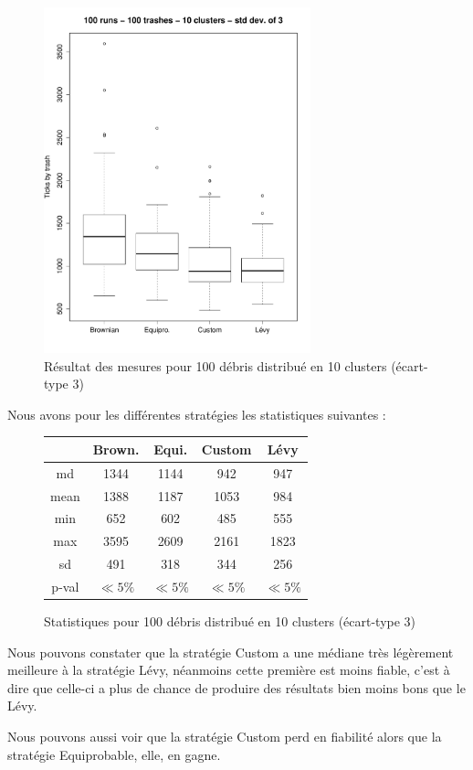 

\begin{figure}[H]
	\begin{center}
		\includegraphics[height=10cm]{diagrams/100Tr10Clts_all.pdf}
		\caption{Résultat des mesures pour 100 débris distribué en 10 clusters (écart-type 3)}
		\label{fig:100Trashes_10Clusters}
	\end{center}
\end{figure}

Nous avons pour les différentes stratégies les statistiques suivantes :

\begin{figure}[H]
	\begin{center}
		\begin{tabular}{| c || c | c | c | c | }
			\hline
			&Brown.&Equi.&Custom&Lévy \\
			\hline
			\hline
			md&1344&1144&942&947\\
			mean&1388&1187&1053&984\\
			min & 652 & 602 & 485 & 555 \\
			max & 3595 & 2609 & 2161 & 1823 \\
			sd&491&318&344&256\\
			p-val&$\ll 5\%$&$\ll 5\%$&$\ll 5\%$&$\ll 5\%$\\
			\hline
		\end{tabular}
		\caption{Statistiques pour 100 débris distribué en 10 clusters (écart-type 3)}
	\end{center}
\end{figure}


Nous pouvons constater que la stratégie Custom a une médiane très
légèrement meilleure à la stratégie Lévy, néanmoins cette première
est moins fiable, c'est à dire que celle-ci a plus de chance de produire
des résultats bien moins bons que le Lévy.

Nous pouvons aussi voir que la stratégie Custom perd en fiabilité
alors que la stratégie Equiprobable, elle, en gagne.